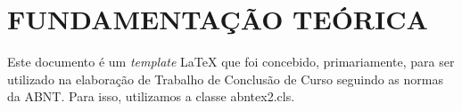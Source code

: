
\chapter{FUNDAMENTAÇÃO TEÓRICA}
\label{chap:fundamentacaoTeorica}

Este documento é um \emph{template} \LaTeX{} que foi concebido, primariamente, para ser utilizado na elaboração de Trabalho de Conclusão de Curso seguindo as normas da ABNT. Para isso, utilizamos a classe {\ttfamily abntex2.cls}.